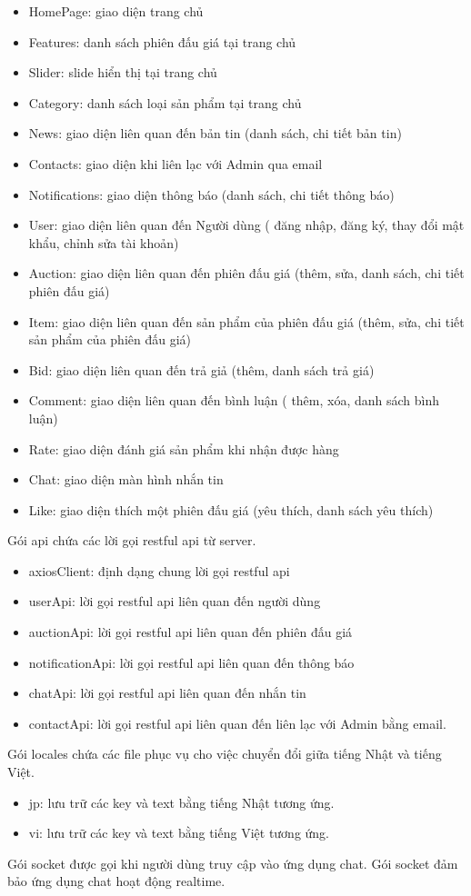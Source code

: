 \documentclass[../DoAn.tex]{subfiles}
\begin{document}
\begin{itemize}
    \item HomePage: giao diện trang chủ
    \item Features: danh sách phiên đấu giá tại trang chủ
    \item Slider: slide hiển thị tại trang chủ
    \item Category: danh sách loại sản phẩm tại trang chủ
    \item News: giao diện liên quan đến bản tin (danh sách, chi tiết bản tin)
    \item Contacts: giao diện khi liên lạc với Admin qua email
    \item Notifications: giao diện thông báo (danh sách, chi tiết thông báo)
    \item User: giao diện liên quan đến Người dùng ( đăng nhập, đăng ký, thay đổi mật khẩu, chỉnh sửa tài khoản)
    \item Auction: giao diện liên quan đến phiên đấu giá (thêm, sửa, danh sách, chi tiết phiên đấu giá)
    \item Item: giao diện liên quan đến sản phẩm của phiên đấu giá (thêm, sửa, chi tiết sản phẩm của phiên đấu giá) 
    \item Bid: giao diện liên quan đến trả giả (thêm, danh sách trả giá)
    \item Comment: giao diện liên quan đến bình luận ( thêm, xóa, danh sách bình luận)
    \item Rate: giao diện đánh giá sản phẩm khi nhận được hàng
    \item Chat: giao diện màn hình nhắn tin
    \item Like: giao diện thích một phiên đấu giá (yêu thích, danh sách yêu thích)
\end{itemize}
Gói api chứa các lời gọi restful api từ server.
\begin{itemize}
    \item axiosClient: định dạng chung lời gọi restful api
    \item userApi: lời gọi restful api liên quan đến người dùng
    \item auctionApi: lời gọi restful api liên quan đến phiên đấu giá
    \item notificationApi: lời gọi restful api liên quan đến thông báo
    \item chatApi: lời gọi restful api liên quan đến nhắn tin
    \item contactApi: lời gọi restful api liên quan đến liên lạc với Admin bằng email.
\end{itemize}
Gói locales chứa các file phục vụ cho việc chuyển đổi giữa tiếng Nhật và tiếng Việt.
\begin{itemize}
    \item jp: lưu trữ các key và text bằng tiếng Nhật tương ứng.
    \item vi: lưu trữ các key và text bằng tiếng Việt tương ứng.
\end{itemize}
Gói socket được gọi khi người dùng truy cập vào ứng dụng chat. Gói socket đảm bảo ứng dụng chat hoạt động realtime.
\end{document}
